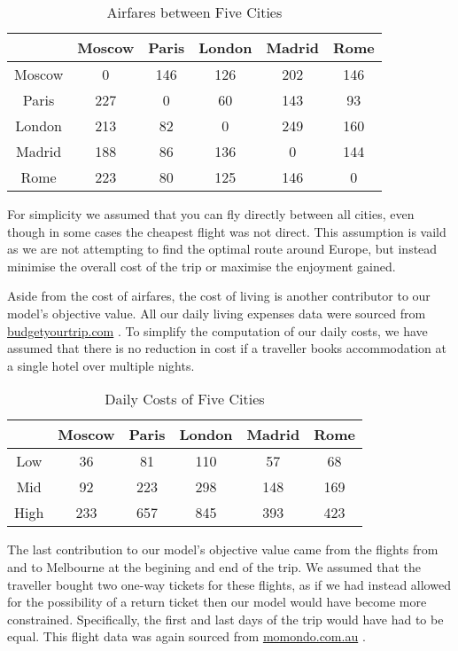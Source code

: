 \documentclass[12pt]{article}
\begin{document}
\begin{table}[h]
\caption{Airfares between Five Cities}
\centering
\vspace{1mm}
\begin{tabular}{c|c|c|c|c|c}
\hline
\rule{0pt}{2ex}  & Moscow & Paris & London & Madrid & Rome \\
\hline
\rule{0pt}{2ex}Moscow & 0 & 146 & 126 & 202 & 146 \\
Paris & 227 & 0 & 60 & 143 & 93 \\
London & 213 & 82 & 0 & 249 & 160 \\
Madrid & 188 & 86 & 136 & 0 & 144 \\
Rome & 223 & 80 & 125 & 146 & 0 \\

\end{tabular}
\end{table}

For simplicity we assumed that you can fly directly between all cities, even though in some cases the cheapest flight was not direct. This assumption is vaild as we are not attempting to find the optimal route around Europe, but instead minimise the overall cost of the trip or maximise the enjoyment gained. 

Aside from the cost of airfares, the cost of living is another contributor to our model's objective value. All our daily living expenses data were sourced from \url{budgetyourtrip.com} \cite{budget}. To simplify the computation of our daily costs, we have assumed that there is no reduction in cost if a traveller books accommodation at a single hotel over multiple nights.

\begin{table}[h]
\caption{Daily Costs of Five Cities}
\centering
\vspace{1mm}
\begin{tabular}{c|c|c|c|c|c}
\hline
\rule{0pt}{2ex}  & Moscow & Paris & London & Madrid & Rome \\
\hline
\rule{0pt}{2ex}Low & 36 & 81 & 110 & 57 & 68 \\
Mid & 92 & 223 & 298 & 148 & 169 \\
High & 233 & 657 & 845 & 393 & 423 \\

\end{tabular}
\end{table}

The last contribution to our model's objective value came from the flights from and to Melbourne at the begining and end of the trip. We assumed that the traveller bought two one-way tickets for these flights, as if we had instead allowed for the possibility of a return ticket then our model would have become more constrained. Specifically, the first and last days of the trip would have had to be equal.  This flight data was again sourced from \url{momondo.com.au} \cite{momondo}.
\end{document}
